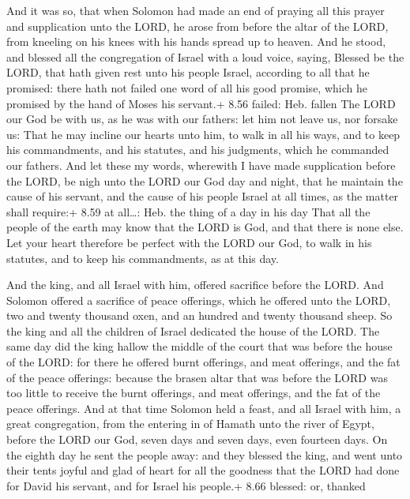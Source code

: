  And it was so, that when Solomon had made an end of
praying all this prayer and supplication unto the LORD, he arose from
before the altar of the LORD, from kneeling on his knees with his hands
spread up to heaven.  And he stood, and blessed all the
congregation of Israel with a loud voice, saying,  Blessed
be the LORD, that hath given rest unto his people Israel, according to
all that he promised: there hath not failed one word of all his good
promise, which he promised by the hand of Moses his servant.+ 8.56
failed: Heb. fallen  The LORD our God be with us, as he was
with our fathers: let him not leave us, nor forsake us: 
That he may incline our hearts unto him, to walk in all his ways, and to
keep his commandments, and his statutes, and his judgments, which he
commanded our fathers.  And let these my words, wherewith I
have made supplication before the LORD, be nigh unto the LORD our God
day and night, that he maintain the cause of his servant, and the cause
of his people Israel at all times, as the matter shall require:+ 8.59 at
all\ldots: Heb. the thing of a day in his day  That all the
people of the earth may know that the LORD is God, and that there is
none else.  Let your heart therefore be perfect with the
LORD our God, to walk in his statutes, and to keep his commandments, as
at this day.

 And the king, and all Israel with him, offered sacrifice
before the LORD.  And Solomon offered a sacrifice of peace
offerings, which he offered unto the LORD, two and twenty thousand oxen,
and an hundred and twenty thousand sheep. So the king and all the
children of Israel dedicated the house of the LORD.  The
same day did the king hallow the middle of the court that was before the
house of the LORD: for there he offered burnt offerings, and meat
offerings, and the fat of the peace offerings: because the brasen altar
that was before the LORD was too little to receive the burnt offerings,
and meat offerings, and the fat of the peace offerings. 
And at that time Solomon held a feast, and all Israel with him, a great
congregation, from the entering in of Hamath unto the river of Egypt,
before the LORD our God, seven days and seven days, even fourteen days.
 On the eighth day he sent the people away: and they
blessed the king, and went unto their tents joyful and glad of heart for
all the goodness that the LORD had done for David his servant, and for
Israel his people.+ 8.66 blessed: or, thanked

